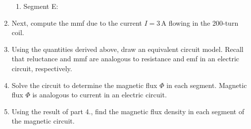 \documentclass[../../header.tex]{subfiles}
\begin{document}
\begin{enumerate}
\begin{enumerate}
\item Segment E: \\

\end{enumerate}

\item Next, compute the mmf due to  the current $I = 3\,\text{A}$ flowing in the 200-turn coil. \\

\item Using the quantities derived above, draw an equivalent circuit model. Recall that reluctance and mmf are analogous to resistance and emf in an electric circuit, respectively.\\

\item Solve the circuit to determine the magnetic flux $\Phi$ in each segment. Magnetic flux $\Phi$ is analogous to current in an electric circuit. \\

\item Using the result of part 4., find the magnetic flux density in each segment of the magnetic circuit.


\end{enumerate}
\end{document}
